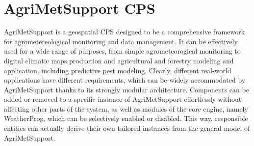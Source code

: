 \documentclass[authoryear,preprint,review,12pt]{elsarticle}
\newcommand{\note}[1]{\emph{\textcolor{red}{#1}}}
\begin{document}

\section{Agri\-Met\-Support CPS} \label{sec:gci}

Agri\-Met\-Support is a geospatial CPS designed to be a comprehensive framework for agrometereological monitoring and data management.
It can be effectively used for a wide range of purposes, from simple agrometeorogical monitoring to digital climatic maps production and agricultural and forestry modeling and application, including predictive pest modeling.
Clearly, different real-world applications have different requirements, which can be widely accommodated by AgriMetSupport thanks to its strongly modular architecture.
Components can be added or removed to a specific instance of AgriMetSupport effortlessly without affecting other parts of the system, as well as modules of the core engine, namely WeatherProg, which can be selectively enabled or disabled.
This way, responsible entities can actually derive their own tailored instances from the general model of AgriMetSupport.
\end{document}
